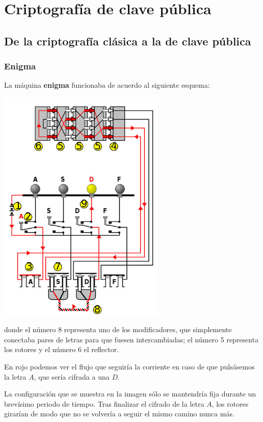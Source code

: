 \chapter{Criptografía de clave pública}
\section{De la criptografía clásica a la de clave pública}

\subsection{Enigma}
La máquina \textbf{enigma} funcionaba de acuerdo al siguiente esquema:
\begin{center}
\includegraphics[width=0.6\textwidth]{img/enigma.jpg}
\end{center}
donde el número 8 representa uno de los modificadores, que simplemente conectaba pares de letras para que fuesen intercambiadas; el número 5 representa los rotores y el número 6 el reflector.

En rojo podemos ver el flujo que seguiría la corriente en caso de que pulsásemos la letra $A$, que sería cifrada a una $D$.

\obs La configuración que se muestra en la imagen sólo se mantendría fija durante un brevísimo periodo de tiempo. Tras finalizar el cifrado de la letra $A$, los rotores girarían de modo que no se volvería a seguir el mismo camino nunca más.

